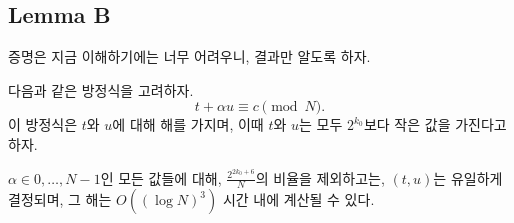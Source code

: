 \subsection{Lemma B}

증명은 지금 이해하기에는 너무 어려우니, 결과만 알도록 하자.

\begin{tcolorbox}[colback=white, sharp corners, boxrule=0.7pt]
    \begin{lemma}
        다음과 같은 방정식을 고려하자.
        $$
            t + \alpha u \equiv c \pmod{N}.
        $$
        이 방정식은 $t$와 $u$에 대해 해를 가지며, 이때 $t$와 $u$는 모두
        $2^{k_0}$보다 작은 값을 가진다고 하자.

        $\alpha \in {0, \dots, N-1}$인 모든 값들에 대해, $\frac{2^{2k_0 +
        6}}{N}$의 비율을 제외하고는, $(t, u)$는 유일하게 결정되며, 그 해는
        $O((\log N)^3)$ 시간 내에 계산될 수 있다.
    \end{lemma}
    \label{lem:small-solution}
\end{tcolorbox}

